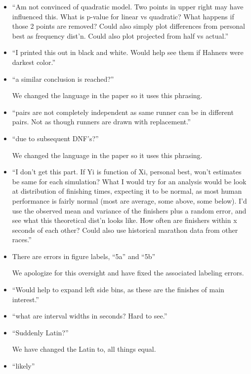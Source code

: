 \documentclass[12pt]{article}
\begin{document}
\begin{itemize}
\item ``Am not convinced of quadratic model. Two points in upper right
  may have influenced this. What is p-value for linear vs quadratic?
  What happens if those 2 points are removed? Could also simply plot
  differences from personal best as frequency dist'n. Could also plot
  projected from half vs actual.''

\item ``I printed this out in black and white. Would help see them if
  Hahners were darkest color.''

\item ``a similar conclusion is reached?''

  We changed the language in the paper so it uses this phrasing.

\item ``pairs are not completely independent as same runner can be in
  different pairs. Not as though runners are drawn with replacement.''

\item ``due to subsequent DNF's?''

  We changed the language in the paper so it uses this phrasing.

\item ``I don't get this part. If Yi is function of Xi, personal best,
  won't estimates be same for each simulation?  What I would try for
  an analysis would be look at distribution of finishing times,
  expecting it to be normal, as most human performance is fairly
  normal (most are average, some above, some below). I'd use the
  observed mean and variance of the finishers plus a random error, and
  see what this theoretical dist'n looks like. How often are finishers
  within x seconds of each other? Could also use historical marathon
  data from other races.''

\item There are errors in figure labels, ``5a'' and ``5b''

  We apologize for this oversight and have fixed the associated
  labeling errors.

\item ``Would help to expand left side bins, as these are the finishes
  of main interest.''

\item ``what are interval widths in seconds? Hard to see.''

\item ``Suddenly Latin?''

  We have changed the Latin to, all things equal.

\item ``likely''


\end{itemize}

 
\end{document}
